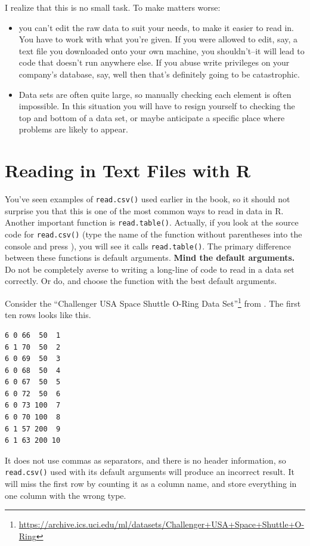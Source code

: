 \documentclass[
  12pt,
]{krantz}
\renewcommand{\href}[2]{#2\footnote{\url{#1}}}
\begin{document}
I realize that this is no small task. To make matters worse:

\begin{itemize}
\item
  you can't edit the raw data to suit your needs, to make it easier to read in. You have to work with what you're given. If you were allowed to edit, say, a text file you downloaded onto your own machine, you shouldn't--it will lead to code that doesn't run anywhere else. If you abuse write privileges on your company's database, say, well then that's definitely going to be catastrophic.
\item
  Data sets are often quite large, so manually checking each element is often impossible. In this situation you will have to resign yourself to checking the top and bottom of a data set, or maybe anticipate a specific place where problems are likely to appear.
\end{itemize}

\hypertarget{reading-in-text-files-with-r}{%
\section{Reading in Text Files with R}\label{reading-in-text-files-with-r}}

You've seen examples of \texttt{read.csv()} used earlier in the book, so it should not surprise you that this is one of the most common ways to read in data in R. Another important function is \texttt{read.table()}. Actually, if you look at the source code for \texttt{read.csv()} (type the name of the function without parentheses into the console and press ), you will see it calls \texttt{read.table()}. The primary difference between these functions is default arguments. \textbf{Mind the default arguments.} Do not be completely averse to writing a long-line of code to read in a data set correctly. Or do, and choose the function with the best default arguments.

Consider the \href{https://archive.ics.uci.edu/ml/datasets/Challenger+USA+Space+Shuttle+O-Ring}{``Challenger USA Space Shuttle O-Ring Data Set''} from \citep{uci_data}. The first ten rows looks like this.

\begin{verbatim}
6 0 66  50  1
6 1 70  50  2
6 0 69  50  3
6 0 68  50  4
6 0 67  50  5
6 0 72  50  6
6 0 73 100  7
6 0 70 100  8
6 1 57 200  9
6 1 63 200 10
\end{verbatim}

It does not use commas as separators, and there is no header information, so \texttt{read.csv()} used with its default arguments will produce an incorrect result. It will miss the first row by counting it as a column name, and store everything in one column with the wrong type.
\end{document}
